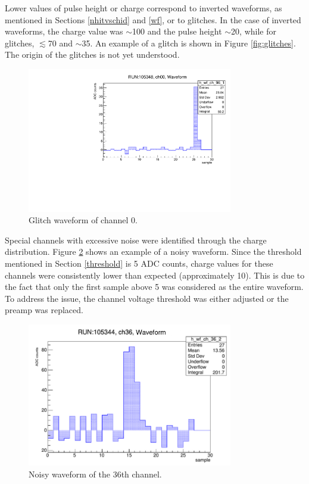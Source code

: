 Lower values of pulse height or charge correspond to inverted waveforms, as mentioned in Sections \ref{nhitvschid} and \ref{wf}, 
or to glitches. In the case of inverted waveforms, the charge value was $\sim$100 and the pulse height $\sim$20, while for glitches, $\lesssim$70 and $\sim$35. 
An example of a glitch is shown in Figure \ref{fig:glitches}. The origin of the glitches is not yet understood.
\begin{figure}[!h]
  \centering
  \includegraphics[width=0.8\textwidth]{figures/pdf/glitch.pdf}
  \caption{Glitch waveform of channel 0.}
  \label{fig:noisywf}
\end{figure}
Special channels with excessive noise were identified through the charge distribution. 
Figure \ref{fig:noisywf} shows an example of a noisy waveform. 
Since the threshold mentioned in Section \ref{threshold} is 5 ADC counts, charge values for these channels were consistently lower than expected (approximately 10). 
This is due to the fact that only the first sample above 5 was considered as the entire waveform.
To address the issue, the channel voltage threshold was either adjusted or the preamp was replaced.
\begin{figure}[!h]
  \centering
  \includegraphics[width=0.8\textwidth]{figures/pdf/noise.pdf}
  \caption{Noisy waveform of the 36th channel.}
  \label{fig:noisywf}
\end{figure}

